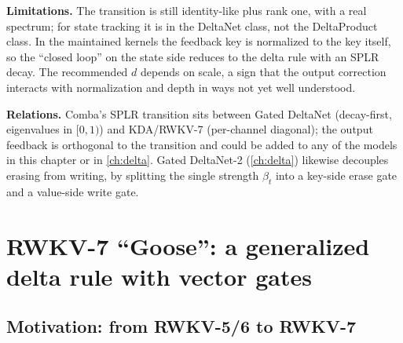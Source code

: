 \textbf{Limitations.} The transition is still identity-like plus rank one, with a real
spectrum; for state tracking it is in the DeltaNet class, not the DeltaProduct class. In the
maintained kernels the feedback key is normalized to the key itself, so the ``closed loop''
on the state side reduces to the delta rule with an SPLR decay. The recommended $d$ depends on
scale, a sign that the output correction interacts with normalization and depth in ways
not yet well understood.

\textbf{Relations.} Comba's SPLR transition sits between Gated DeltaNet (decay-first,
eigenvalues in $[0,1)$) and KDA/RWKV-7 (per-channel diagonal); the output feedback is
orthogonal to the transition and could be added to any of the models in this chapter or in
\cref{ch:delta}. Gated DeltaNet-2 (\cref{ch:delta}) likewise decouples erasing from
writing, by splitting the single strength $\beta_t$ into a key-side erase gate and a value-side
write gate.

\section{RWKV-7 ``Goose'': a generalized delta rule with vector gates}\label{sec:c06-rwkv7}

\subsection{Motivation: from RWKV-5/6 to RWKV-7}


